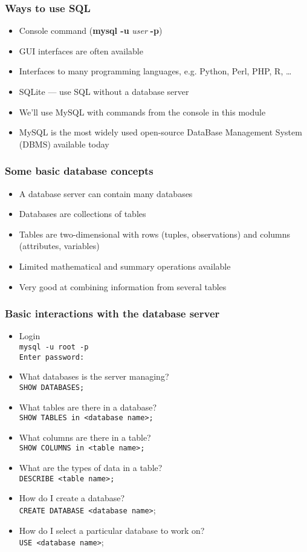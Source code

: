 \documentclass[hyperref={pdfpagelabels=false},svgnames,xcolor=table]{beamer}
\begin{document}
\begin{frame}
  \frametitle{Ways to use SQL}
  \begin{itemize}
    \item Console command (\textbf{mysql -u} \emph{user} \textbf{-p})
    \item GUI interfaces are often available
    \item Interfaces to many programming languages, e.g. Python, Perl, PHP,
      R, \ldots
    \item SQLite --- use SQL without a database server
    \item We'll use MySQL with commands from the console in this module
    \item MySQL is the most widely used open-source DataBase Management 
      System (DBMS) available today
  \end{itemize}
\end{frame}

\begin{frame}
  \frametitle{Some basic database concepts}
  \begin{itemize}
    \item A database server can contain many databases
    \item Databases are collections of tables
    \item Tables are two-dimensional with rows (tuples, observations)
      and columns (attributes, variables)
    \item Limited mathematical and summary operations available
    \item Very good at combining information from several tables
  \end{itemize}
\end{frame}

\begin{frame}[fragile]
  \frametitle{Basic interactions with the database server}
  \begin{itemize}
    \item Login \\
      \verb'mysql -u root -p' \\
      \verb'Enter password: '
    \item What databases is the server managing? \\
      \verb'SHOW DATABASES;'
    \item What tables are there in a database? \\
      \verb'SHOW TABLES in <database name>;'
    \item What columns are there in a table? \\
      \verb'SHOW COLUMNS in <table name>;'
    \item What are the types of data in a table? \\
      \verb'DESCRIBE <table name>;'
    \item How do I create a database? \\
      \verb'CREATE DATABASE <database name>';
    \item How do I select a particular database to work on? \\
      \verb'USE <database name>';
  \end{itemize}
\end{frame}
\end{document}
